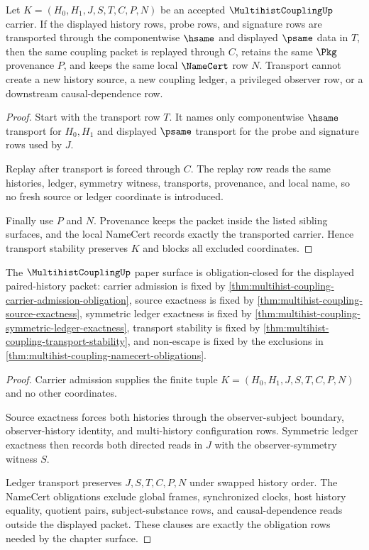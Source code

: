 \begin{theorem}
\label{thm:multihist-coupling-transport-stability}
Let $K=(H_0,H_1,J,S,T,C,P,N)$ be an accepted $\MultihistCouplingUp$ carrier. If the displayed history rows, probe rows, and signature rows are transported through the componentwise $\hsame$ and displayed $\psame$ data in $T$, then the same coupling packet is replayed through $C$, retains the same $\Pkg$ provenance $P$, and keeps the same local $\NameCert$ row $N$. Transport cannot create a new history source, a new coupling ledger, a privileged observer row, or a downstream causal-dependence row.
\end{theorem}
\begin{proof}
Start with the transport row $T$. It names only componentwise $\hsame$ transport for $H_0,H_1$ and displayed $\psame$ transport for the probe and signature rows used by $J$.

Replay after transport is forced through $C$. The replay row reads the same histories, ledger, symmetry witness, transports, provenance, and local name, so no fresh source or ledger coordinate is introduced.

Finally use $P$ and $N$. Provenance keeps the packet inside the listed sibling surfaces, and the local NameCert records exactly the transported carrier. Hence transport stability preserves $K$ and blocks all excluded coordinates.
\end{proof}

\begin{theorem}
\label{thm:multihist-coupling-obligation-closure}
The $\MultihistCouplingUp$ paper surface is obligation-closed for the displayed paired-history packet: carrier admission is fixed by \autoref{thm:multihist-coupling-carrier-admission-obligation}, source exactness is fixed by \autoref{thm:multihist-coupling-source-exactness}, symmetric ledger exactness is fixed by \autoref{thm:multihist-coupling-symmetric-ledger-exactness}, transport stability is fixed by \autoref{thm:multihist-coupling-transport-stability}, and non-escape is fixed by the exclusions in \autoref{thm:multihist-coupling-namecert-obligations}.
\end{theorem}
\begin{proof}
Carrier admission supplies the finite tuple $K=(H_0,H_1,J,S,T,C,P,N)$ and no other coordinates.

Source exactness forces both histories through the observer-subject boundary, observer-history identity, and multi-history configuration rows. Symmetric ledger exactness then records both directed reads in $J$ with the observer-symmetry witness $S$.

Ledger transport preserves $J,S,T,C,P,N$ under swapped history order. The NameCert obligations exclude global frames, synchronized clocks, host history equality, quotient pairs, subject-substance rows, and causal-dependence reads outside the displayed packet. These clauses are exactly the obligation rows needed by the chapter surface.
\end{proof}

